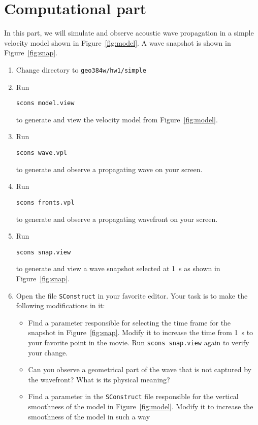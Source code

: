 \section{Computational part}

In this part, we will simulate and observe acoustic wave propagation
in a simple velocity model shown in Figure~\ref{fig:model}. A wave snapshot is shown in Figure~\ref{fig:snap}.


\begin{enumerate}
\item Change directory to \verb#geo384w/hw1/simple#
\item Run
\begin{verbatim}
scons model.view
\end{verbatim}
to generate and view the velocity model from Figure~\ref{fig:model}.
\item Run
\begin{verbatim}
scons wave.vpl
\end{verbatim}
to generate and observe a propagating wave on your screen.
\item Run
\begin{verbatim}
scons fronts.vpl
\end{verbatim}
to generate and observe a propagating wavefront on your screen.
\item Run
\begin{verbatim}
scons snap.view
\end{verbatim}
to generate and view a wave snapshot selected at 1~s as shown in Figure~\ref{fig:snap}.
\item Open the file \texttt{SConstruct} in your favorite editor. Your task is to make the following modifications in it:
\begin{itemize}
\item Find a parameter responsible for selecting the time frame for the snapshot in Figure~\ref{fig:snap}. 
Modify it to increase the time from 1~s to your favorite point in the movie. Run \texttt{scons snap.view} again to verify your change.
\item Can you observe a geometrical part of the wave that is not captured by the wavefront? What is its physical meaning?
\item Find a parameter in the \texttt{SConstruct} file 
responsible for the vertical smoothness of the model in Figure~\ref{fig:model}. Modify it to increase the smoothness of the model in such a way 

\end{itemize}
\end{enumerate}
